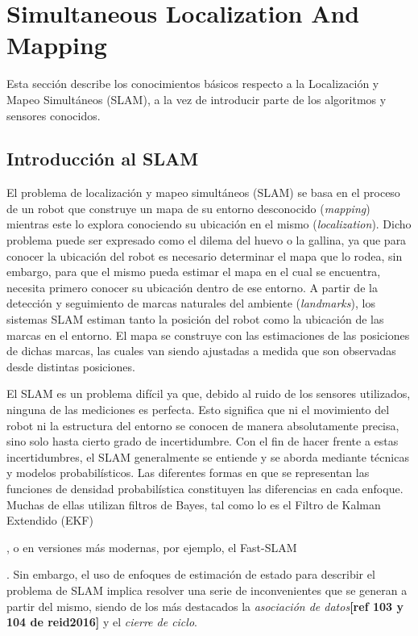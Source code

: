 
\section{Simultaneous Localization And Mapping}
Esta sección describe los conocimientos básicos respecto a la Localización y Mapeo Simultáneos (SLAM), a la vez de introducir parte de los algoritmos y sensores conocidos.

\subsection{Introducción al SLAM}
El problema de localización y mapeo simultáneos (SLAM) se basa en el proceso de un robot que construye un mapa de su entorno desconocido (\textit{mapping}) mientras este lo explora conociendo su ubicación en el mismo (\textit{localization}). Dicho problema puede ser expresado como el dilema del huevo o la gallina, ya que para conocer la ubicación del robot es necesario determinar el mapa que lo rodea, sin embargo, para que el mismo pueda estimar el mapa en el cual se encuentra, necesita primero conocer su ubicación dentro de ese entorno. A partir de la detección y seguimiento de marcas naturales del ambiente (\textit{landmarks}), los sistemas SLAM estiman tanto la posición del robot como la ubicación de las marcas en el entorno. El mapa se construye con las estimaciones de las posiciones de dichas marcas, las cuales van siendo ajustadas a medida que son observadas desde distintas posiciones.

El SLAM es un problema difícil ya que, debido al ruido de los sensores utilizados, ninguna de las mediciones es perfecta. Esto significa que ni el movimiento del robot ni la estructura del entorno se conocen de manera absolutamente precisa, sino solo hasta cierto grado de incertidumbre. Con el fin de hacer frente a estas incertidumbres, el SLAM generalmente se entiende y se aborda mediante técnicas y modelos probabilísticos. Las diferentes formas en que se representan las funciones de densidad probabilística constituyen las diferencias en cada enfoque. Muchas de ellas utilizan filtros de Bayes, tal como lo es el Filtro de Kalman Extendido (EKF) 
\begin{large}
\end{large}, o en versiones más modernas, por ejemplo, el Fast-SLAM
\begin{large}
\end{large}. 
Sin embargo, el uso de enfoques de estimación de estado para describir el problema de SLAM implica resolver una serie de inconvenientes que se generan a partir del mismo, siendo de los más destacados la \textit{asociación de datos}\textbf{[ref 103 y 104 de reid2016]} y el \textit{cierre de ciclo}.

